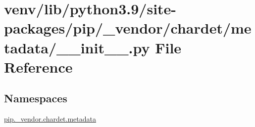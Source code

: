\hypertarget{venv_2lib_2python3_89_2site-packages_2pip_2__vendor_2chardet_2metadata_2____init_____8py}{}\section{venv/lib/python3.9/site-\/packages/pip/\+\_\+vendor/chardet/metadata/\+\_\+\+\_\+init\+\_\+\+\_\+.py File Reference}
\label{venv_2lib_2python3_89_2site-packages_2pip_2__vendor_2chardet_2metadata_2____init_____8py}
\subsection*{Namespaces}
\begin{DoxyCompactItemize}
\item 
 \hyperlink{namespacepip_1_1__vendor_1_1chardet_1_1metadata}{pip.\+\_\+vendor.\+chardet.\+metadata}
\end{DoxyCompactItemize}
